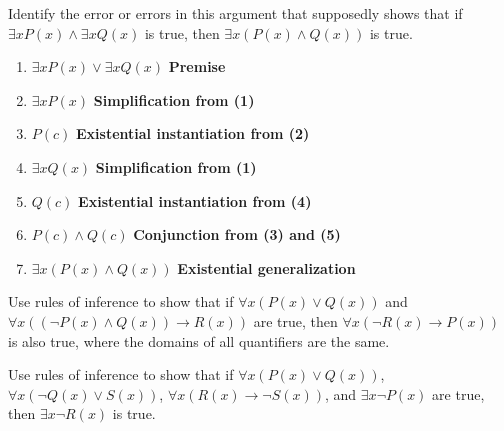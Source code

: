 \documentclass{exam}
\begin{document}
\begin{questions}
\question Identify the error or errors in this argument that supposedly shows that if $\exists x P(x) \land \exists x Q(x)$ is true, then $\exists x (P(x) \land Q(x))$ is true.
\begin{enumerate}
  \item $\exists xP(x) \lor \exists xQ(x)$ \textbf{Premise}
  \item $\exists xP(x)$ \textbf{Simplification from (1)}
  \item $P(c)$ \textbf{Existential instantiation from (2)}
  \item $\exists xQ(x)$ \textbf{Simplification from (1)}
  \item $Q(c)$ \textbf{Existential instantiation from (4)}
  \item $P(c) \land Q(c)$ \textbf{Conjunction from (3) and (5)}
  \item $\exists x(P(x) \land Q(x))$ \textbf{Existential generalization}
\end{enumerate}
\newpage
\newpage


\question Use rules of inference to show that if $\forall x(P(x) \lor Q(x))$ and $\forall x((\neg P(x) \land Q(x)) \rightarrow R(x))$ are true, then $\forall x(\neg R(x) \rightarrow P(x))$ is also true, where the domains of all quantifiers are the same.
\vspace{9in}


\question Use rules of inference to show that if $\forall x(P(x) \lor Q(x))$, $\forall x(\neg Q(x) \lor S(x))$, $\forall x(R(x) \rightarrow \neg S(x))$, and $\exists x\neg P(x)$ are true, then $\exists x\neg R(x)$ is true.

\vspace{9in}




\end{questions}
\end{document}
